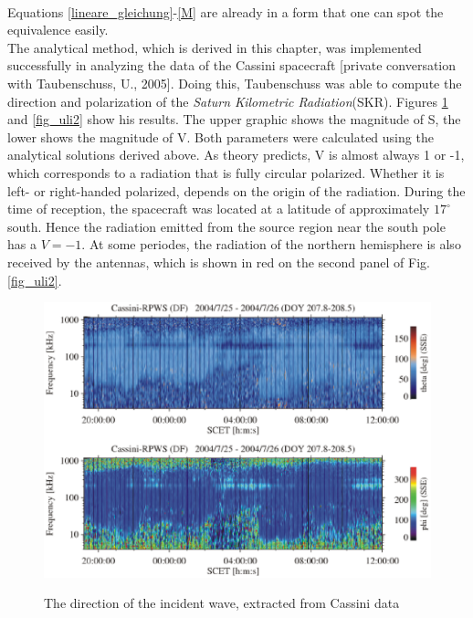 \documentclass[a4paper,10pt]{thesis}
\begin{document}
\paragraph*{}
Equations \ref{lineare_gleichung}-\ref{M} are already in a form that one can spot the equivalence easily.\\

The analytical method, which is derived in this chapter, was implemented successfully in analyzing the data of the Cassini spacecraft [private conversation with Taubenschuss, U., 2005]. Doing this, Taubenschuss was able to compute the direction and polarization of the \emph{Saturn Kilometric Radiation}(SKR). Figures \ref{fig_uli1} and \ref{fig_uli2} show his results. The upper graphic shows the magnitude of S, the lower shows the magnitude of V. Both parameters were calculated using the analytical solutions derived above. As theory predicts, V is almost always 1 or -1, which corresponds to a radiation that is fully circular polarized. Whether it is left- or right-handed polarized, depends on the origin of the radiation. During the time of reception, the spacecraft was located at a latitude of approximately $17^\circ $ south. Hence the radiation emitted from the source region near the south pole has a $V = -1$. At some periodes, the radiation of the northern hemisphere is also received by the antennas, which is shown in red on the second panel of Fig. \ref{fig_uli2}.

\begin{figure}
  \includegraphics[width=12cm]{uli3.eps}\\
  \caption{The direction of the incident wave, extracted from Cassini data \cite{uli1}}\label{fig_uli1}
\end{figure}
\end{document}
